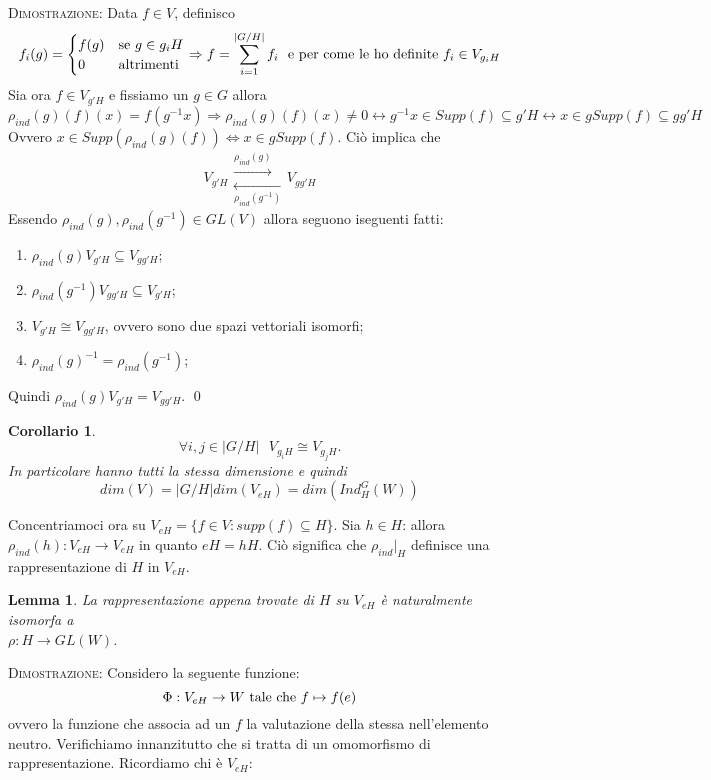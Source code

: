 \documentclass[11pt]{article}
\theoremstyle{plain}
\newtheorem{lemma}[thm]{Lemma}
\newtheorem*{cor}{Corollario}
\theoremstyle{definition}
\theoremstyle{remark}
\begin{document}
\textsc{Dimostrazione:} Data $f\in V$, definisco
\[f_i(g)=\begin{cases}
f(g)& \textup{se } g\in g_iH\\
0& \textup{altrimenti}
\end{cases}\Rightarrow f=\sum_{i=1}^{|G/H|} f_i\ \textup{ e per come le ho definite } f_i\in V_{g_iH}\]
Sia ora $f\in V_{g'H}$ e fissiamo un $g\in G$ allora
\[\rho_{ind}(g)(f)(x)=f(g^{-1}x)\Rightarrow \rho_{ind}(g)(f)(x)\neq 0\leftrightarrow g^{-1}x\in Supp(f)\subseteq g'H\leftrightarrow x\in gSupp(f)\subseteq gg'H\]
Ovvero $x\in Supp(\rho_{ind}(g)(f))\Leftrightarrow x\in gSupp(f)$. Ciò implica che
\[ V_{g'H} \begin{matrix}
\overset{\rho_{ind}(g)}{\longrightarrow}\\ 
\underset{\rho_{ind}(g^{-1})}{\longleftarrow}
\end{matrix} V_{gg'H} \]
Essendo $\rho_{ind}(g),\rho_{ind}(g^{-1})\in GL(V)$ allora seguono iseguenti fatti:
\begin{enumerate}
\item $\rho_{ind}(g)V_{g'H}\subseteq V_{gg'H}$;
\item $\rho_{ind}(g^{-1})V_{gg'H}\subseteq V_{g'H}$;
\item $V_{g'H}\cong V_{gg'H}$, ovvero sono due spazi vettoriali isomorfi;
\item $\rho_{ind}(g)^{-1}=\rho_{ind}(g^{-1})$;
\end{enumerate}
Quindi $\rho_{ind}(g)V_{g'H}=V_{gg'H}$. \qed
\\ 
\begin{cor}
\[\forall i,j\in |G/H|\ \ \ V_{g_iH}\cong V_{g_jH}.\]
In particolare hanno tutti la stessa dimensione e quindi
\[dim(V)=|G/H|dim(V_{eH})=dim(Ind_H^G(W))\]
\end{cor}
Concentriamoci ora su $V_{eH}=\{f\in V:supp(f)\subseteq H\}$. Sia $h\in H$: allora $\rho_{ind}(h):V_{eH}\rightarrow V_{eH}$ in quanto $eH=hH$. Ciò significa che $\rho_{ind}|_{H}$ definisce una rappresentazione di $H$ in $V_{eH}$.
\begin{lemma}
La rappresentazione appena trovate di $H$ su $V_{eH}$ è naturalmente isomorfa a\\ $\rho:H\rightarrow GL(W)$.
\end{lemma}
\textsc{Dimostrazione:} Considero la seguente funzione: 
\[\Phi:V_{eH}\rightarrow W\ \textup{tale che } f\mapsto f(e)\]
ovvero la funzione che associa ad un $f$ la valutazione della stessa nell'elemento neutro. Verifichiamo innanzitutto che si tratta di un omomorfismo di rappresentazione. Ricordiamo chi è $V_{eH}$:
\end{document}
